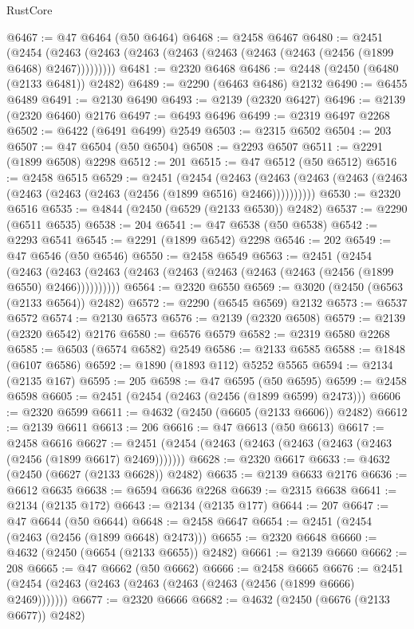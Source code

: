 \begin{lexlean}{RustCore}
\begin{coremodule}
@6467 := @47 @6464 (@50 @6464)
@6468 := @2458 @6467
@6480 := @2451
    (@2454 (@2463 (@2463 (@2463 (@2463 (@2463 (@2463 (@2463 (@2456 (@1899 @6468) @2467)))))))))
@6481 := @2320 @6468
@6486 := @2448 (@2450 (@6480 (@2133 @6481)) @2482)
@6489 := @2290 (@6463 @6486) @2132
@6490 := @6455 @6489
@6491 := @2130 @6490
@6493 := @2139 (@2320 @6427)
@6496 := @2139 (@2320 @6460) @2176
@6497 := @6493 @6496
@6499 := @2319 @6497 @2268
@6502 := @6422 (@6491 @6499) @2549
@6503 := @2315 @6502
@6504 := 203
@6507 := @47 @6504 (@50 @6504)
@6508 := @2293 @6507
@6511 := @2291 (@1899 @6508) @2298
@6512 := 201
@6515 := @47 @6512 (@50 @6512)
@6516 := @2458 @6515
@6529 := @2451
    (@2454
      (@2463 (@2463 (@2463 (@2463 (@2463 (@2463 (@2463 (@2463 (@2456 (@1899 @6516) @2466))))))))))
@6530 := @2320 @6516
@6535 := @4844 (@2450 (@6529 (@2133 @6530)) @2482)
@6537 := @2290 (@6511 @6535)
@6538 := 204
@6541 := @47 @6538 (@50 @6538)
@6542 := @2293 @6541
@6545 := @2291 (@1899 @6542) @2298
@6546 := 202
@6549 := @47 @6546 (@50 @6546)
@6550 := @2458 @6549
@6563 := @2451
    (@2454
      (@2463 (@2463 (@2463 (@2463 (@2463 (@2463 (@2463 (@2463 (@2456 (@1899 @6550) @2466))))))))))
@6564 := @2320 @6550
@6569 := @3020 (@2450 (@6563 (@2133 @6564)) @2482)
@6572 := @2290 (@6545 @6569) @2132
@6573 := @6537 @6572
@6574 := @2130 @6573
@6576 := @2139 (@2320 @6508)
@6579 := @2139 (@2320 @6542) @2176
@6580 := @6576 @6579
@6582 := @2319 @6580 @2268
@6585 := @6503 (@6574 @6582) @2549
@6586 := @2133 @6585
@6588 := @1848 (@6107 @6586)
@6592 := @1890 (@1893 @112) @5252 @5565
@6594 := @2134 (@2135 @167)
@6595 := 205
@6598 := @47 @6595 (@50 @6595)
@6599 := @2458 @6598
@6605 := @2451 (@2454 (@2463 (@2456 (@1899 @6599) @2473)))
@6606 := @2320 @6599
@6611 := @4632 (@2450 (@6605 (@2133 @6606)) @2482)
@6612 := @2139 @6611
@6613 := 206
@6616 := @47 @6613 (@50 @6613)
@6617 := @2458 @6616
@6627 := @2451 (@2454 (@2463 (@2463 (@2463 (@2463 (@2463 (@2456 (@1899 @6617) @2469)))))))
@6628 := @2320 @6617
@6633 := @4632 (@2450 (@6627 (@2133 @6628)) @2482)
@6635 := @2139 @6633 @2176
@6636 := @6612 @6635
@6638 := @6594 @6636 @2268
@6639 := @2315 @6638
@6641 := @2134 (@2135 @172)
@6643 := @2134 (@2135 @177)
@6644 := 207
@6647 := @47 @6644 (@50 @6644)
@6648 := @2458 @6647
@6654 := @2451 (@2454 (@2463 (@2456 (@1899 @6648) @2473)))
@6655 := @2320 @6648
@6660 := @4632 (@2450 (@6654 (@2133 @6655)) @2482)
@6661 := @2139 @6660
@6662 := 208
@6665 := @47 @6662 (@50 @6662)
@6666 := @2458 @6665
@6676 := @2451 (@2454 (@2463 (@2463 (@2463 (@2463 (@2463 (@2456 (@1899 @6666) @2469)))))))
@6677 := @2320 @6666
@6682 := @4632 (@2450 (@6676 (@2133 @6677)) @2482)

\end{coremodule}
\end{lexlean}
